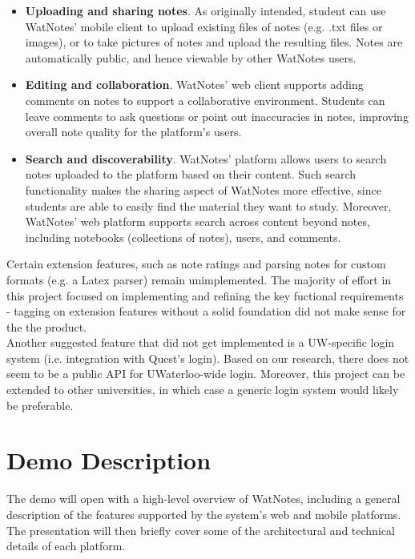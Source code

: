 \documentclass[12pt]{article}
\begin{document}
    \begin{itemize}
      \item
        \textbf{Uploading and sharing notes}. As originally intended, student can use WatNotes' mobile client to upload existing
        files of notes (e.g. .txt files or images), or to take pictures of notes and upload the resulting files. Notes are
        automatically public, and hence viewable by other WatNotes users.
      \item
        \textbf{Editing and collaboration}. WatNotes' web client supports adding comments on notes to support a collaborative environment.
        Students can leave comments to ask questions or point out inaccuracies in notes, improving overall note quality for
        the platform's users.
      \item
        \textbf{Search and discoverability}. WatNotes' platform allows users to search notes uploaded to the platform based on their content.
        Such search functionality makes the sharing aspect of WatNotes more effective, since students are able to easily find the
        material they want to study. Moreover, WatNotes' web platform supports search across content beyond notes, including notebooks
        (collections of notes), users, and comments.
    \end{itemize}

    Certain extension features, such as note ratings and parsing notes for custom formats (e.g. a Latex parser) remain unimplemented.
    The majority of effort in this project focused on implementing and refining the key fuctional requirements - tagging on extension
    features without a solid foundation did not make sense for the the product. \\

    Another suggested feature that did not get implemented is a UW-specific login system (i.e. integration with Quest's login).
    Based on our research, there does not seem to be a public API for UWaterloo-wide login. Moreover, this project can be extended
    to other universities, in which case a generic login system would likely be preferable.
  \newpage

  \section{Demo Description}
    The demo will open with a high-level overview of WatNotes, including a general description of the features supported by the system's web
    and mobile platforms. The presentation will then briefly cover some of the architectural and technical details of each platform. \\
    
\end{document}
